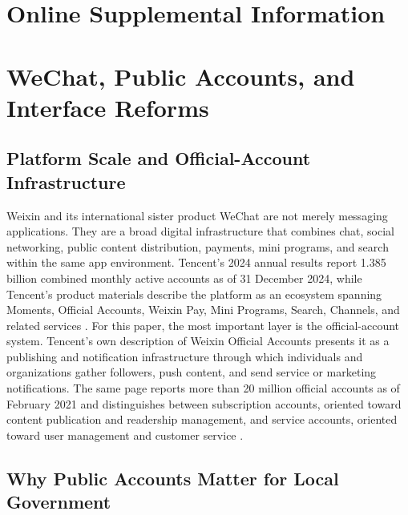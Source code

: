 \documentclass[12pt, american]{article}
\begin{document}
\newpage

\appendix

\section*{Online Supplemental Information}
\doublespacing
\startcontents[sections] 
\setcounter{page}{0} 
\thispagestyle{empty}
\newpage
\renewcommand{\thepage}{SI-\arabic{page}}
\setcounter{figure}{0} 
\renewcommand{\thefigure}{SI.\arabic{figure}}     
\setcounter{table}{0} 
\renewcommand{\thetable}{SI.\arabic{table}}

\singlespacing

\section{WeChat, Public Accounts, and Interface Reforms \label{app:wechat-context}}

\subsection{Platform Scale and Official-Account Infrastructure}

Weixin and its international sister product WeChat are not merely messaging applications. They are a broad digital infrastructure that combines chat, social networking, public content distribution, payments, mini programs, and search within the same app environment. Tencent's 2024 annual results report 1.385 billion combined monthly active accounts as of 31 December 2024, while Tencent's product materials describe the platform as an ecosystem spanning Moments, Official Accounts, Weixin Pay, Mini Programs, Search, Channels, and related services \parencite{Tencent2025AnnualResults,TencentWeixinWeChatPage}. For this paper, the most important layer is the official-account system. Tencent's own description of Weixin Official Accounts presents it as a publishing and notification infrastructure through which individuals and organizations gather followers, push content, and send service or marketing notifications. The same page reports more than 20 million official accounts as of February 2021 and distinguishes between subscription accounts, oriented toward content publication and readership management, and service accounts, oriented toward user management and customer service \parencite{TencentOfficialAccountsPage}.

\subsection{Why Public Accounts Matter for Local Government}
\end{document}
